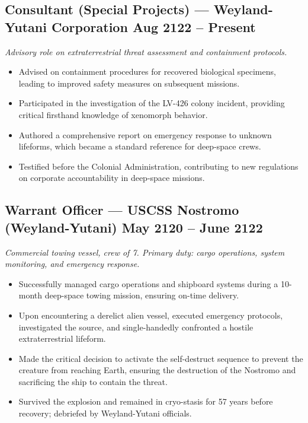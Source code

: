 \vspace{-0.5cm}
\subsection*{Consultant (Special Projects) — Weyland-Yutani Corporation \hfill Aug 2122 – Present}
\textit{Advisory role on extraterrestrial threat assessment and containment protocols.}
\begin{itemize}[leftmargin=1em, topsep=10pt, parsep=0pt]
    \item Advised on containment procedures for recovered biological specimens, leading to improved safety measures on subsequent missions.
    \item Participated in the investigation of the LV-426 colony incident, providing critical firsthand knowledge of xenomorph behavior.
    \item Authored a comprehensive report on emergency response to unknown lifeforms, which became a standard reference for deep-space crews.
    \item Testified before the Colonial Administration, contributing to new regulations on corporate accountability in deep-space missions.
\end{itemize}
\subsection*{Warrant Officer — USCSS Nostromo (Weyland-Yutani) \hfill May 2120 – June 2122}
\textit{Commercial towing vessel, crew of 7. Primary duty: cargo operations, system monitoring, and emergency response.}
\begin{itemize}[leftmargin=1em, topsep=10pt, parsep=0pt]
    \item Successfully managed cargo operations and shipboard systems during a 10-month deep-space towing mission, ensuring on-time delivery.
    \item Upon encountering a derelict alien vessel, executed emergency protocols, investigated the source, and single-handedly confronted a hostile extraterrestrial lifeform.
    \item Made the critical decision to activate the self-destruct sequence to prevent the creature from reaching Earth, ensuring the destruction of the Nostromo and sacrificing the ship to contain the threat.
    \item Survived the explosion and remained in cryo-stasis for 57 years before recovery; debriefed by Weyland-Yutani officials.
\end{itemize}
\vspace{2.0ex}
